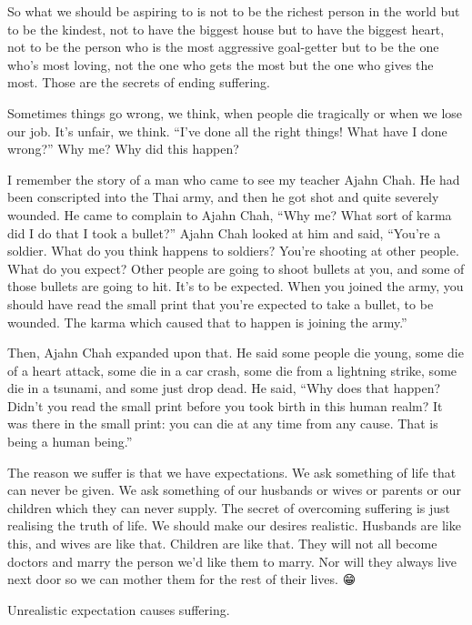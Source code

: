 \documentclass[12pt, openany]{book}
\newenvironment{aphorism}%
{%
\begin{center}\begin{itshape}
}%
{\end{itshape}\end{center}
}%
\begin{document}
So what we should be aspiring to is not to be the richest person in the world but to be the kindest, not to have the biggest house but to have the biggest heart, not to be the person who is the most aggressive goal-getter but to be the one who’s most loving, not the one who gets the most but the one who gives the most. Those are the secrets of ending suffering. 

Sometimes things go wrong, we think, when people die tragically or when we lose our job. It’s unfair, we think. “I’ve done all the right things! What have I done wrong?” Why me? Why did this happen? 

I remember the story of a man who came to see my teacher Ajahn Chah. He had been conscripted into the Thai army, and then he got shot and quite severely wounded. He came to complain to Ajahn Chah, “Why me? What sort of karma did I do that I took a bullet?” Ajahn Chah looked at him and said, “You’re a soldier. What do you think happens to soldiers? You’re shooting at other people. What do you expect? Other people are going to shoot bullets at you, and some of those bullets are going to hit. It’s to be expected. When you joined the army, you should have read the small print that you’re expected to take a bullet, to be wounded. The karma which caused that to happen is joining the army.” 

Then, Ajahn Chah expanded upon that. He said some people die young, some die of a heart attack, some die in a car crash, some die from a lightning strike, some die in a tsunami, and some just drop dead. He said, “Why does that happen? Didn’t you read the small print before you took birth in this human realm? It was there in the small print: you can die at any time from any cause. That is being a human being.” 

The reason we suffer is that we have expectations. We ask something of life that can never be given. We ask something of our husbands or wives or parents or our children which they can never supply. The secret of overcoming suffering is just realising the truth of life. We should make our desires realistic. Husbands are like this, and wives are like that. Children are like that. They will not all become doctors and marry the person we’d like them to marry. Nor will they always live next door so we can mother them for the rest of their lives. 😁 

\begin{aphorism}
Unrealistic expectation causes suffering.
\end{aphorism}
\end{document}
